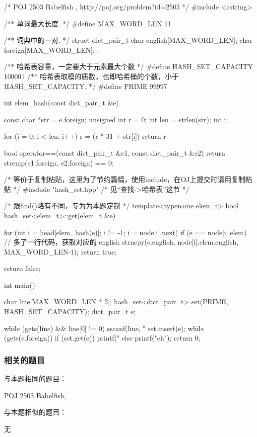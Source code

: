 \begin{Codex}[label=babelfish.cpp]
/* POJ 2503 Babelfish , http://poj.org/problem?id=2503 */
#include <cstring>

/** 单词最大长度. */
#define MAX_WORD_LEN   11

/** 词典中的一对. */
struct dict_pair_t {
    char english[MAX_WORD_LEN];
    char foreign[MAX_WORD_LEN];
};

/** 哈希表容量，一定要大于元素最大个数  */
#define HASH_SET_CAPACITY  100001
/** 哈希表取模的质数，也即哈希桶的个数，小于 HASH_SET_CAPACITY. */
#define PRIME  99997

int elem_hash(const dict_pair_t &e) {
    const char *str = e.foreign;
    unsigned int r = 0;
    int len = strlen(str);
    int i;

    for (i = 0; i < len; i++) {
        r = (r * 31 + str[i]) %
    }
    return r %
}

bool operator==(const dict_pair_t &e1, const dict_pair_t &e2) {
    return strcmp(e1.foreign, e2.foreign) == 0;
}

/* 等价于复制粘贴，这里为了节约篇幅，使用include，在OJ上提交时请用复制粘贴 */
#include "hash_set.hpp"  /* 见“查找->哈希表”这节 */

/* 跟find()略有不同，专为为本题定制 */
template<typename elem_t>
bool hash_set<elem_t>::get(elem_t &e) {
    for (int i = head[elem_hash(e)]; i != -1; i = node[i].next)
        if (e == node[i].elem) {
            // 多了一行代码，获取对应的 english
            strncpy(e.english, node[i].elem.english, MAX_WORD_LEN-1);
            return true;
        }

    return false;
}


int main() {
    char line[MAX_WORD_LEN * 2];
    hash_set<dict_pair_t> set(PRIME, HASH_SET_CAPACITY);
    dict_pair_t e;

    while (gets(line) && line[0] != 0) {
        sscanf(line, "%
        set.insert(e);
    }
    while (gets(e.foreign)) {
        if (set.get(e)) printf("%
        else printf("eh\n");
    }
    return 0;
}
\end{Codex}


\subsubsection{相关的题目}
与本题相同的题目：
\begindot
\item POJ 2503 Babelfish, 
\myenddot

与本题相似的题目：
\begindot
\item  无
\myenddot
